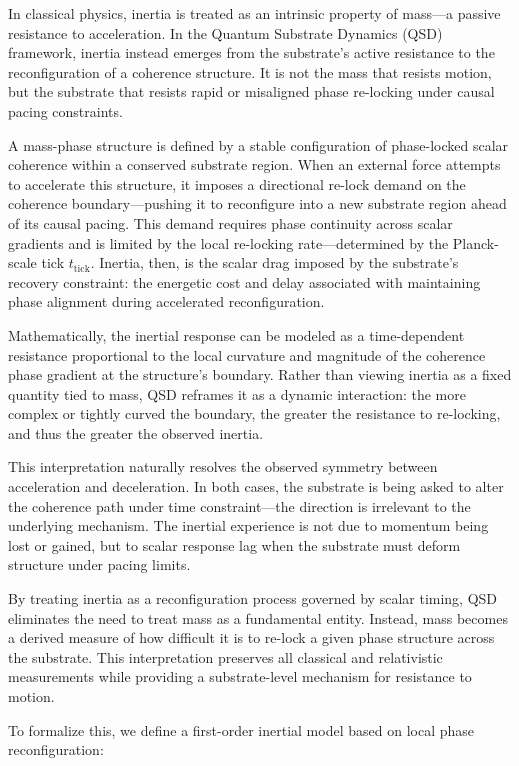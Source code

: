 \documentclass[entropy,article,submit,pdftex,moreauthors]{Definitions/mdpi}
\begin{document}
In classical physics, inertia is treated as an intrinsic property of mass—a passive resistance to acceleration. In the Quantum Substrate Dynamics (QSD) framework, inertia instead emerges from the substrate’s active resistance to the reconfiguration of a coherence structure. It is not the mass that resists motion, but the substrate that resists rapid or misaligned phase re-locking under causal pacing constraints.

A mass-phase structure is defined by a stable configuration of phase-locked scalar coherence within a conserved substrate region. When an external force attempts to accelerate this structure, it imposes a directional re-lock demand on the coherence boundary—pushing it to reconfigure into a new substrate region ahead of its causal pacing. This demand requires phase continuity across scalar gradients and is limited by the local re-locking rate—determined by the Planck-scale tick \( t_{\text{tick}} \). Inertia, then, is the scalar drag imposed by the substrate's recovery constraint: the energetic cost and delay associated with maintaining phase alignment during accelerated reconfiguration.

Mathematically, the inertial response can be modeled as a time-dependent resistance proportional to the local curvature and magnitude of the coherence phase gradient at the structure's boundary. Rather than viewing inertia as a fixed quantity tied to mass, QSD reframes it as a dynamic interaction: the more complex or tightly curved the boundary, the greater the resistance to re-locking, and thus the greater the observed inertia.

This interpretation naturally resolves the observed symmetry between acceleration and deceleration. In both cases, the substrate is being asked to alter the coherence path under time constraint—the direction is irrelevant to the underlying mechanism. The inertial experience is not due to momentum being lost or gained, but to scalar response lag when the substrate must deform structure under pacing limits.

By treating inertia as a reconfiguration process governed by scalar timing, QSD eliminates the need to treat mass as a fundamental entity. Instead, mass becomes a derived measure of how difficult it is to re-lock a given phase structure across the substrate. This interpretation preserves all classical and relativistic measurements while providing a substrate-level mechanism for resistance to motion.

To formalize this, we define a first-order inertial model based on local phase reconfiguration:
\end{document}
